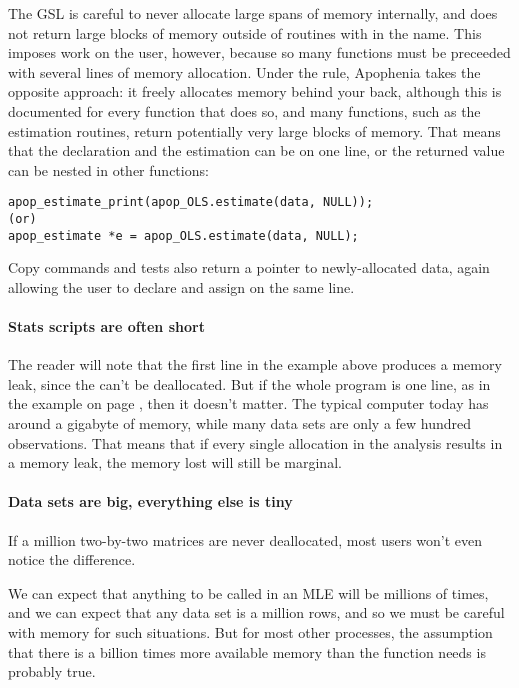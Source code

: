 {The GSL is careful to never allocate large
spans of memory internally, and does not return large blocks of memory
outside of routines with  in the name. This imposes work
on the user, however, because so many functions must be preceeded with
several lines of memory allocation. Under the 
rule, Apophenia takes the opposite approach: it freely allocates memory behind
your back, although this is documented for every function that does so,
and many functions, such as the estimation routines, return potentially
very large blocks of memory. That means that the declaration and the
estimation can be on one line, or the returned value can be nested in
other functions:
\lstset{numbers=left, numberstyle=\scshape}
\begin{lstlisting}
apop_estimate_print(apop_OLS.estimate(data, NULL));
(or)
apop_estimate *e = apop_OLS.estimate(data, NULL);
\end{lstlisting}
\lstset{numbers=none}
Copy commands and tests also return a pointer to newly-allocated data,
again allowing the user to declare and assign on the same line.

\paragraph{Stats scripts are often short}
The reader will note that the first line in the example above
produces a memory leak, since the  can't be
deallocated. But if the whole program is one line, as in the example on
page \pageref{oneliner}, then it doesn't matter. The typical computer
today has around a gigabyte of memory, while many data sets are only a few
hundred observations. That means that if every single allocation in the
analysis results in a memory leak, the memory lost will still be marginal.

\paragraph{Data sets are big, everything else is tiny}
If a million two-by-two matrices are never deallocated, most
users won't even notice the difference.

We can expect that anything to be called in an MLE will be millions of
times, and we can expect that any data set is a million rows, and so we
must be careful with memory for such situations. But for most other
processes, the assumption that there is a billion times more available
memory than the function needs is probably true.


}
